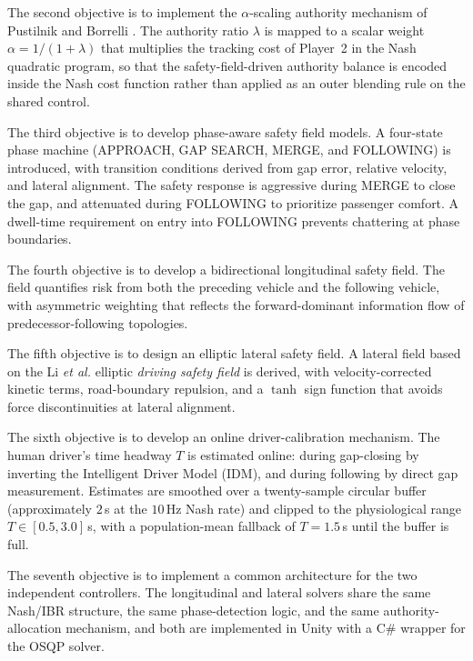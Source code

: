\documentclass[12pt,a4paper,oneside]{report}
\begin{document}
The second objective is to implement the $\alpha$-scaling authority mechanism of
Pustilnik and Borrelli \cite{pustilnikGeneralizedNashEquilibrium2025}. The authority ratio $\lambda$ is mapped to a scalar weight $\alpha = 1/(1+\lambda)$ that multiplies the tracking cost
of Player~2 in the Nash quadratic program, so that the safety-field-driven
authority balance is encoded inside the Nash cost function rather than applied as
an outer blending rule on the shared control.

The third objective is to develop phase-aware safety field models. A four-state
phase machine (APPROACH, GAP SEARCH, MERGE, and FOLLOWING) is introduced, with
transition conditions derived from gap error, relative velocity, and lateral
alignment. The safety response is aggressive during MERGE to close the gap, and
attenuated during FOLLOWING to prioritize passenger comfort. A dwell-time
requirement on entry into FOLLOWING prevents chattering at phase boundaries.


The fourth objective is to develop a bidirectional longitudinal safety field. The
field quantifies risk from both the preceding vehicle and the following vehicle,
with asymmetric weighting that reflects the forward-dominant information flow of
predecessor-following topologies.

The fifth objective is to design an elliptic lateral safety field. A lateral field
based on the Li \emph{et al.} \cite{liSharedControlNovel2019} elliptic \emph{driving safety
field} is derived, with velocity-corrected kinetic terms, road-boundary repulsion,
and a $\tanh$ sign function that avoids force discontinuities at lateral alignment.

The sixth objective is to develop an online driver-calibration mechanism. The human
driver's time headway $T$ is estimated online: during gap-closing by inverting the
Intelligent Driver Model (IDM), and during following by direct gap measurement.
Estimates are smoothed over a twenty-sample circular buffer (approximately $2$\,s
at the $10$\,Hz Nash rate) and clipped to the physiological range
$T \in [0.5, 3.0]$\,s, with a population-mean fallback of $T = 1.5$\,s until the
buffer is full.

The seventh objective is to implement a common architecture for the two independent
controllers. The longitudinal and lateral solvers share the same Nash/IBR structure,
the same phase-detection logic, and the same authority-allocation mechanism, and
both are implemented in Unity with a C\# wrapper for the OSQP solver.
\end{document}
